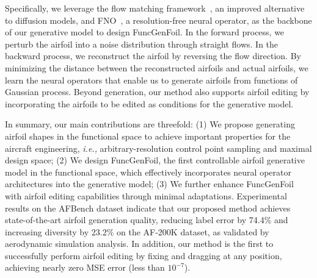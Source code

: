 Specifically, we leverage the flow matching framework~\cite{lipman2022flow}, an improved alternative to diffusion models, and FNO~\cite{li2021fourier}, a resolution-free neural operator, as the backbone of our generative model to design FuncGenFoil.  In the forward process, we perturb the airfoil into a noise distribution through straight flows. In the backward process, we reconstruct the airfoil by reversing the flow direction. By minimizing the distance between the reconstructed airfoils and actual airfoils, we learn the neural operators that enable us to generate airfoils from functions of Gaussian process. Beyond generation, our method also supports airfoil editing by incorporating the airfoils to be edited as conditions for the generative model.

In summary, our main contributions are threefold: (1) We propose generating airfoil shapes in the functional space to achieve important properties for the aircraft engineering, \emph{i.e.,} arbitrary-resolution control point sampling and maximal design space; (2) We design FuncGenFoil, the first controllable airfoil generative model in the functional space, which effectively incorporates neural operator architectures into the generative model; (3) We further enhance FuncGenFoil with airfoil editing capabilities through minimal adaptations.
Experimental results on the AFBench dataset indicate that our proposed method achieves state-of-the-art airfoil generation quality, reducing label error by 74.4\% and increasing diversity by 23.2\% on the AF-200K dataset, as validated by aerodynamic simulation analysis.  
In addition, our method is the first to successfully perform airfoil editing by fixing and dragging at any position, achieving nearly zero MSE error (less than $10^{-7}$).
